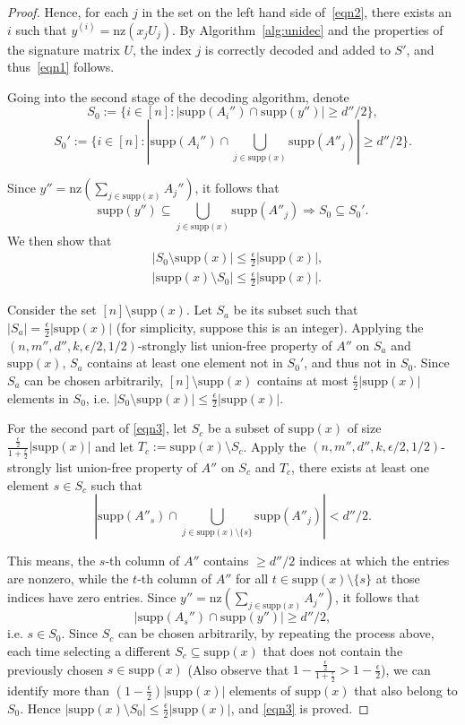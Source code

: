 \documentclass{article}
\newcommand{\supp}{\mathrm{supp}}
\newcommand{\nz}{\mathrm{nz}}
\begin{document}
\begin{proof}
Hence, for each $j$ in the set on the left hand side of~\eqref{eqn2}, there exists an $i$ such that $y^{(i)} = \nz(x_jU_j)$. By Algorithm~\ref{alg:unidec} and the properties of the signature matrix $U$, the index $j$ is correctly decoded and added to $S'$, and thus~\eqref{eqn1} follows.

Going into the second stage of the decoding algorithm, denote
\[
    S_0:=\{i\in[n]:|\supp(A_i'')\cap\supp(y'')|\geq d''/2\},
\]
\[
    S_0':=\{i\in[n]:|\supp(A_i'')\cap\bigcup_{j\in\supp(x)}\supp(A''_j)|\geq d''/2\}.
\]

Since $y''=\nz\left(\sum_{j\in\supp(x)}A_j''\right)$, it follows that
\[\supp(y'')\subseteq \bigcup_{j\in\supp(x)}\supp(A''_j)\Rightarrow S_0\subseteq S_0'. \] 
We then show that
\begin{equation}\label{eqn3}
\begin{aligned}
    & |S_0 \setminus \supp(x)| \leq \frac{\epsilon}{2}|\supp(x)|, \\
    & |\supp(x) \setminus S_0| \leq \frac{\epsilon}{2}|\supp(x)|.
\end{aligned}
\end{equation}

Consider the set $[n]\setminus \supp(x)$. Let $S_a$ be its subset such that $|S_a|=\frac{\epsilon}{2}|\supp(x)|$ (for simplicity, suppose this is an integer). Applying the $(n,m'',d'',k,\epsilon/2,1/2)$-strongly list union-free property of $A''$ on $S_a$ and $\supp(x)$, $S_a$ contains at least one element not in $S_0'$, and thus not in $S_0$. Since $S_a$ can be chosen arbitrarily, $[n]\setminus \supp(x)$ contains at most $\frac{\epsilon}{2}|\supp(x)|$ elements in $S_0$, i.e. $|S_0 \setminus \supp(x)| \leq \frac{\epsilon}{2}|\supp(x)|$. 

For the second part of \eqref{eqn3}, let $S_c$ be a subset of $\supp(x)$ of size $\frac{\frac{\epsilon}{2}}{1+\frac{\epsilon}{2}}|\supp(x)|$ and let $T_c:=\supp(x)\setminus S_c$. Apply the $(n,m'',d'',k,\epsilon/2,1/2)$-strongly list union-free property of $A''$ on $S_c$ and $T_c$, there exists at least one element $s\in S_c$ such that \[\left|\supp(A''_s)\cap\bigcup_{j\in\supp(x)\setminus{\{s\}}}\supp(A''_j)\right|< d''/2. \]

This means, the $s$-th column of $A''$ contains $\geq d''/2$ indices at which the entries are nonzero, while the $t$-th column of $A''$ for all $t\in\supp(x)\setminus\{s\}$ at those indices have zero entries. Since $y''=\nz\left(\sum_{j\in\supp(x)}A_j''\right)$, it follows that \[|\supp(A_s'')\cap\supp(y'')|\geq d''/2, \]
i.e. $s\in S_0$. Since $S_c$ can be chosen arbitrarily, by repeating the process above, each time selecting a different $S_c\subseteq \supp(x)$ that does not contain the previously chosen $s\in\supp(x)$ (Also observe that
$1-\frac{\frac{\epsilon}{2}}{1+\frac{\epsilon}{2}}
>1-\frac{\epsilon}{2}$), 
we can identify more than $\left(1-\frac{\epsilon}{2}\right)|\supp(x)|$ elements of $\supp(x)$ that also belong to $S_0$.
Hence $|\supp(x) \setminus S_0| \leq \frac{\epsilon}{2}|\supp(x)|$, and \eqref{eqn3} is proved. 


\end{proof}
\end{document}
